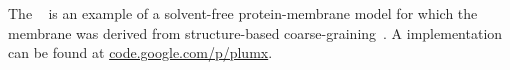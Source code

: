 The ~\cite{bereau12} is an example of a solvent-free
protein-membrane model for which the membrane was derived from structure-based
coarse-graining~\cite{wang_jpcb10}.  A {\gromacs} implementation can be found at
\href{http://code.google.com/p/plumx/}{code.google.com/p/plumx}. 

